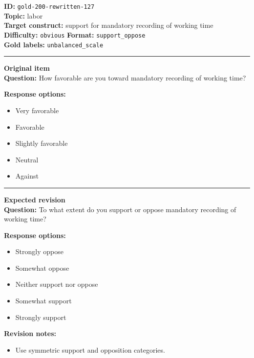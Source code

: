 \documentclass[10pt,a4paper]{article}
\newcommand{\sectionline}{\vspace{0.15em}\hrule\vspace{0.35em}}
\begin{document}
\begin{tcolorbox}[colframe=FlawRed,colback=white,colbacktitle=FlawRed!9,coltitle=black,title={Item 127\hfill Flawed item}]
\textbf{ID:} \texttt{gold-200-rewritten-127}\\
\textbf{Topic:} labor\\
\textbf{Target construct:} support for mandatory recording of working time\\
\textbf{Difficulty:} \texttt{obvious} \quad \textbf{Format:} \texttt{support\_oppose}\\
\textbf{Gold labels:} \texttt{unbalanced\_scale}\\
\sectionline
\textbf{Original item}\\
\textbf{Question:} How favorable are you toward mandatory recording of working time?
\par\textbf{Response options:}
\begin{itemize}
\item Very favorable
\item Favorable
\item Slightly favorable
\item Neutral
\item Against
\end{itemize}
\sectionline
\textbf{Expected revision}\\
\textbf{Question:} To what extent do you support or oppose mandatory recording of working time?
\par\textbf{Response options:}
\begin{itemize}
\item Strongly oppose
\item Somewhat oppose
\item Neither support nor oppose
\item Somewhat support
\item Strongly support
\end{itemize}
\par\textbf{Revision notes:}
\begin{itemize}
\item Use symmetric support and opposition categories.
\end{itemize}
\end{tcolorbox}
\end{document}
